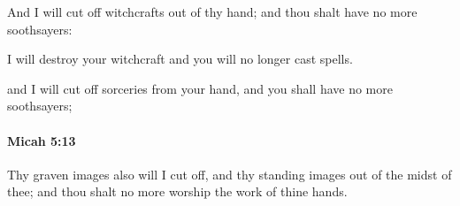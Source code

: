 			\begin{versebox}
					\item[BHS] 
					\item[LXX] 
					\item[ASV] And I will cut off witchcrafts out of thy hand; and thou shalt have no more soothsayers:
					\item[NIV] I will destroy your witchcraft and you will no longer cast spells.
					\item[NRSV] and I will cut off sorceries from your hand, and you shall have no more soothsayers;
			\end{versebox}

		\paragraph{Micah 5:13} %
			\label{MICAH-5-13}

			Thy graven images also will I cut off, and thy standing images out of the midst of thee; and thou shalt no more worship the work of thine hands.

